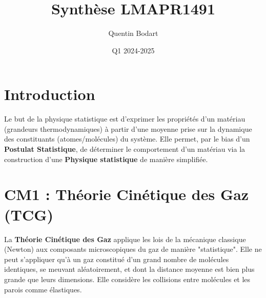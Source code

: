 \documentclass{article}
\title{Synthèse LMAPR1491}
\author{Quentin Bodart}
\date{Q1 2024-2025}
\begin{document}
\maketitle
\tableofcontents
\pagebreak

\section*{Introduction}
    Le but de la physique statistique est d'exprimer les propriétés d'un matériau (grandeurs thermodynamiques) à partir d'une moyenne prise sur la dynamique des constituants (atomes/molécules) du système.
    Elle permet, par le bias d'un \textbf{Postulat Statistique}, de déterminer le comportement d'un matériau via la construction d'une \textbf{Physique statistique} de manière simplifiée.

\section{CM1 : Théorie Cinétique des Gaz (TCG)}
    La \textbf{Théorie Cinétique des Gaz} applique les lois de la mécanique classique (Newton) aux composants microscopiques du gaz de manière "statistique". Elle ne peut s'appliquer qu'à un gaz constitué d'un grand nombre de molécules identiques, se meuvant aléatoirement, et dont la distance moyenne est bien plus grande que leurs dimensions. Elle considère les collisions entre molécules et les parois comme élastiques.
\end{document}
